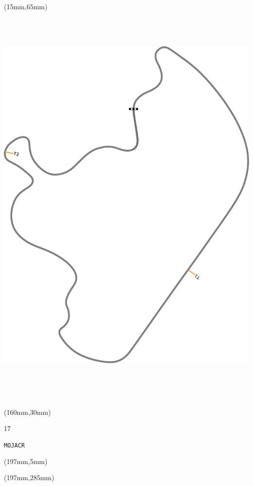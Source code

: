 \begin{textblock*}{185mm}(15mm,65mm)%
\centering
\mbox{\includegraphics[width=185mm,height=210mm,keepaspectratio]{PT/MOJACR.pdf}}
\end{textblock*}
\begin{textblock*}{40mm}(160mm,30mm)%
\Large
\par{} 
\par17 
\par\hfill\tiny\tt MOJACR\\
\end{textblock*}
\begin{textblock*}{20mm}(197mm,5mm)%
\fbox{\thepage}
\label{MOJACR}
\end{textblock*}
\begin{textblock*}{20mm}(197mm,285mm)%
\fbox{\thepage}
\end{textblock*}

